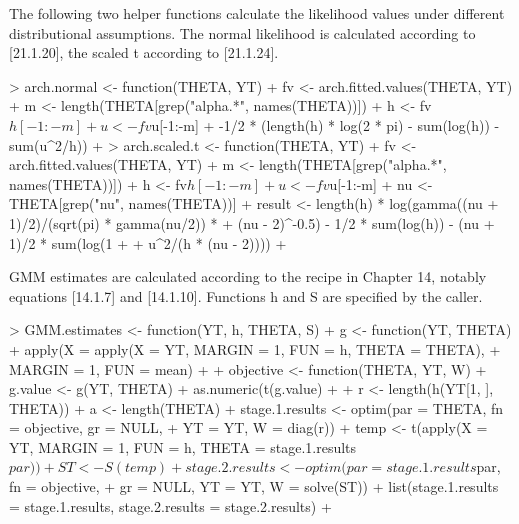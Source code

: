 The following two helper functions calculate the likelihood values under different distributional assumptions.
The normal likelihood is calculated according to [21.1.20], the scaled t according to [21.1.24].
\begin{Schunk}
\begin{Sinput}
> arch.normal <- function(THETA, YT) {
+     fv <- arch.fitted.values(THETA, YT)
+     m <- length(THETA[grep("alpha.*", names(THETA))])
+     h <- fv$h[-1:-m]
+     u <- fv$u[-1:-m]
+     -1/2 * (length(h) * log(2 * pi) - sum(log(h)) - sum(u^2/h))
+ }
> arch.scaled.t <- function(THETA, YT) {
+     fv <- arch.fitted.values(THETA, YT)
+     m <- length(THETA[grep("alpha.*", names(THETA))])
+     h <- fv$h[-1:-m]
+     u <- fv$u[-1:-m]
+     nu <- THETA[grep("nu", names(THETA))]
+     result <- length(h) * log(gamma((nu + 1)/2)/(sqrt(pi) * gamma(nu/2)) * 
+         (nu - 2)^-0.5) - 1/2 * sum(log(h)) - (nu + 1)/2 * sum(log(1 + 
+         u^2/(h * (nu - 2))))
+ }
\end{Sinput}
\end{Schunk}
GMM estimates are calculated according to the recipe in Chapter 14, notably
equations [14.1.7] and [14.1.10].  Functions h and S are specified
by the caller.
\begin{Schunk}
\begin{Sinput}
> GMM.estimates <- function(YT, h, THETA, S) {
+     g <- function(YT, THETA) {
+         apply(X = apply(X = YT, MARGIN = 1, FUN = h, THETA = THETA), 
+             MARGIN = 1, FUN = mean)
+     }
+     objective <- function(THETA, YT, W) {
+         g.value <- g(YT, THETA)
+         as.numeric(t(g.value) %
+     }
+     r <- length(h(YT[1, ], THETA))
+     a <- length(THETA)
+     stage.1.results <- optim(par = THETA, fn = objective, gr = NULL, 
+         YT = YT, W = diag(r))
+     temp <- t(apply(X = YT, MARGIN = 1, FUN = h, THETA = stage.1.results$par))
+     ST <- S(temp)
+     stage.2.results <- optim(par = stage.1.results$par, fn = objective, 
+         gr = NULL, YT = YT, W = solve(ST))
+     list(stage.1.results = stage.1.results, stage.2.results = stage.2.results)
+ }
\end{Sinput}
\end{Schunk}
